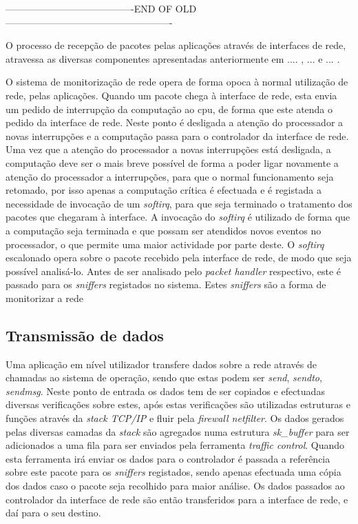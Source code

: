 ----------------------------------------END OF OLD----------------------------------------------------

O processo de recepção de pacotes pelas aplicações através de interfaces de rede, atravessa as diversas componentes apresentadas anteriormente em .... , ... e ... .

O sistema de monitorização de rede opera de forma opoca à normal utilização de rede, pelas aplicações.
Quando um pacote chega à interface de rede, esta envia um pedido de interrupção da computação ao cpu, de forma que este atenda o pedido da interface de rede.
Neste ponto é desligada a atenção do processador a novas interrupções e a computação passa para o controlador da interface de rede.
Uma vez que a atenção do processador a novas interrupções está desligada, a computação deve ser o mais breve possível de forma a poder ligar novamente a atenção do processador a interrupções, para que o normal funcionamento seja retomado, por isso apenas a computação crítica é efectuada e é registada a necessidade de invocação de um \textit{softirq}, para que seja terminado o tratamento dos pacotes que chegaram à interface.
A invocação do \textit{softirq} é utilizado de forma que a computação seja terminada e que possam ser atendidos novos eventos no processador, o que permite uma maior actividade por parte deste.
O \textit{softirq} escalonado opera sobre o pacote recebido pela interface de rede, de modo que seja possível analisá-lo.
Antes de ser analisado pelo \textit{packet handler} respectivo, este é passado para os \textit{sniffers} registados no sistema.
Estes \textit{sniffers} são a forma de monitorizar a rede

\subsection{Transmissão de dados}

Uma aplicação em nível utilizador transfere dados sobre a rede através de chamadas ao sistema de operação, sendo que estas podem ser \textit{send}, \textit{sendto}, \textit{sendmsg}.
 Neste ponto de entrada os dados tem de ser copiados e efectuadas diversas verificações sobre estes, após estas verificações são utilizadas estruturas e funções através da \textit{stack TCP/IP} e fluir pela \textit{firewall netfilter}.
 Os dados gerados pelas diversas camadas da \textit{stack} são agregados numa estrutura \textit{sk\_buffer} para ser adicionados a uma fila para ser enviados pela ferramenta \textit{traffic control}.
 Quando esta ferramenta irá enviar os dados para o controlador é passada a referência sobre este pacote para os \textit{sniffers} registados, sendo apenas efectuada uma cópia dos dados caso o pacote seja recolhido para maior análise. Os dados passados ao controlador da interface de rede são então transferidos para a interface de rede, e daí para o seu destino.

